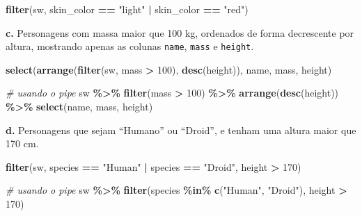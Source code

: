 \documentclass[
]{book}
\newenvironment{Shaded}{\begin{snugshade}}{\end{snugshade}}
\newcommand{\CommentTok}[1]{\textcolor[rgb]{0.56,0.35,0.01}{\textit{#1}}}
\newcommand{\DecValTok}[1]{\textcolor[rgb]{0.00,0.00,0.81}{#1}}
\newcommand{\FunctionTok}[1]{\textcolor[rgb]{0.13,0.29,0.53}{\textbf{#1}}}
\newcommand{\NormalTok}[1]{#1}
\newcommand{\SpecialCharTok}[1]{\textcolor[rgb]{0.81,0.36,0.00}{\textbf{#1}}}
\newcommand{\StringTok}[1]{\textcolor[rgb]{0.31,0.60,0.02}{#1}}
\begin{document}
\begin{Shaded}
\begin{Highlighting}[]
\FunctionTok{filter}\NormalTok{(sw, skin\_color }\SpecialCharTok{==} \StringTok{"light"} \SpecialCharTok{|}\NormalTok{ skin\_color }\SpecialCharTok{==} \StringTok{"red"}\NormalTok{)}
\end{Highlighting}
\end{Shaded}

\textbf{c.} Personagens com massa maior que 100 kg, ordenados de forma
decrescente por altura, mostrando apenas as colunas \texttt{name}, \texttt{mass} e
\texttt{height}.

\begin{Shaded}
\begin{Highlighting}[]
\FunctionTok{select}\NormalTok{(}\FunctionTok{arrange}\NormalTok{(}\FunctionTok{filter}\NormalTok{(sw, mass }\SpecialCharTok{\textgreater{}} \DecValTok{100}\NormalTok{), }\FunctionTok{desc}\NormalTok{(height)), name, mass, height)}

\CommentTok{\# usando o pipe}
\NormalTok{sw }\SpecialCharTok{\%\textgreater{}\%} 
  \FunctionTok{filter}\NormalTok{(mass }\SpecialCharTok{\textgreater{}} \DecValTok{100}\NormalTok{) }\SpecialCharTok{\%\textgreater{}\%} 
  \FunctionTok{arrange}\NormalTok{(}\FunctionTok{desc}\NormalTok{(height)) }\SpecialCharTok{\%\textgreater{}\%} 
  \FunctionTok{select}\NormalTok{(name, mass, height)}
\end{Highlighting}
\end{Shaded}

\textbf{d.} Personagens que sejam ``Humano'' ou ``Droid'', e tenham uma altura
maior que 170 cm.

\begin{Shaded}
\begin{Highlighting}[]
\FunctionTok{filter}\NormalTok{(sw, species }\SpecialCharTok{==} \StringTok{"Human"} \SpecialCharTok{|}\NormalTok{ species }\SpecialCharTok{==} \StringTok{"Droid"}\NormalTok{, height }\SpecialCharTok{\textgreater{}} \DecValTok{170}\NormalTok{)}

\CommentTok{\# usando o pipe}
\NormalTok{sw }\SpecialCharTok{\%\textgreater{}\%} 
  \FunctionTok{filter}\NormalTok{(species }\SpecialCharTok{\%in\%} \FunctionTok{c}\NormalTok{(}\StringTok{"Human"}\NormalTok{, }\StringTok{"Droid"}\NormalTok{), height }\SpecialCharTok{\textgreater{}} \DecValTok{170}\NormalTok{)}
\end{Highlighting}
\end{Shaded}
\end{document}

